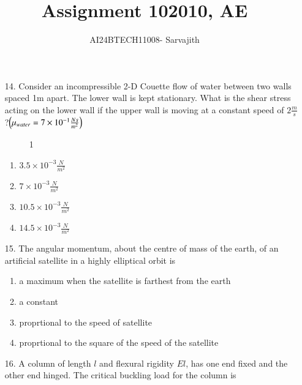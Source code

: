 \documentclass[journal]{IEEEtran}
\begin{document}

\vspace{3cm}


\author{AI24BTECH11008- Sarvajith
}
\title{Assignment 10}
{\let\newpage\relax\maketitle}
\title{2010, AE}
\renewcommand{\thefigure}{\theenumi}
\renewcommand{\thetable}{\theenumi}
\setlength{\intextsep}{10pt} %
\renewcommand{\thetable}{\theenumi}
\begin{enumerate}
 \item[14.] Consider an incompressible 2-D Couette flow of water between two walls spaced 1m apart. The lower wall is kept stationary. What is the shear stress acting on the lower wall if the upper wall is moving at a constant speed of $2\frac{m}{s}$?$\left(\mu_{water}=7\times 10^{-1}\frac{Ns}{m^2}\right)$
 \begin{figure}[!ht]
    \centering
    \caption{1}
    \label{fig:1}
\end{figure}
 \begin{enumerate}[label=(\Alph*)]
    \item $3.5\times 10^{-3}\frac{N}{m^2}$
    \item $7\times 10^{-3}\frac{N}{m^2}$
    \item $10.5\times 10^{-3}\frac{N}{m^2}$
    \item $14.5\times 10^{-3}\frac{N}{m^2}$
 \end{enumerate}
 \item[15.] The angular momentum, about the centre of mass of the earth, of an artificial satellite in a highly elliptical orbit is 
 \begin{enumerate}[label=(\Alph*)]
    \item a maximum when the satellite is farthest from the earth
    \item a constant
    \item proprtional to the speed of satellite
    \item proprtional to the square of the speed of the satellite
 \end{enumerate}
 \item[16.] A column of length $l$ and flexural rigidity $El$, has one end fixed and the other end hinged. The critical buckling load for the column is 

\end{enumerate}
\end{document}

